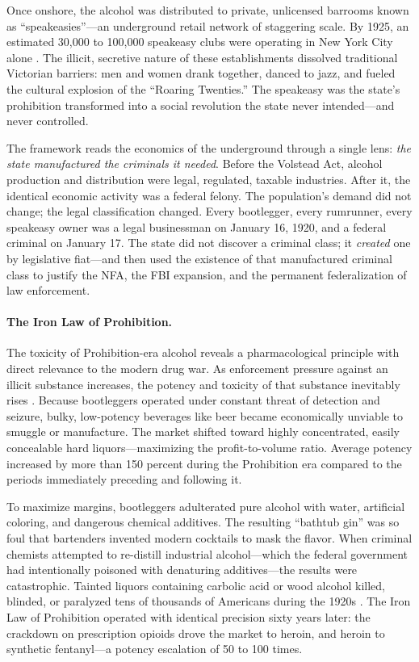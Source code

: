 \documentclass[12pt,openany]{book}
\begin{document}
Once onshore, the alcohol was distributed to private, unlicensed barrooms known as ``speakeasies''---an underground retail network of staggering scale. By 1925, an estimated 30,000 to 100,000 speakeasy clubs were operating in New York City alone \cite{mobmuseum_speakeasies}. The illicit, secretive nature of these establishments dissolved traditional Victorian barriers: men and women drank together, danced to jazz, and fueled the cultural explosion of the ``Roaring Twenties.'' The speakeasy was the state's prohibition transformed into a social revolution the state never intended---and never controlled.

The framework reads the economics of the underground through a single lens: \textit{the state manufactured the criminals it needed}. Before the Volstead Act, alcohol production and distribution were legal, regulated, taxable industries. After it, the identical economic activity was a federal felony. The population's demand did not change; the legal classification changed. Every bootlegger, every rumrunner, every speakeasy owner was a legal businessman on January 16, 1920, and a federal criminal on January 17. The state did not discover a criminal class; it \textit{created} one by legislative fiat---and then used the existence of that manufactured criminal class to justify the NFA, the FBI expansion, and the permanent federalization of law enforcement.

\paragraph{The Iron Law of Prohibition.}
The toxicity of Prohibition-era alcohol reveals a pharmacological principle with direct relevance to the modern drug war. As enforcement pressure against an illicit substance increases, the potency and toxicity of that substance inevitably rises \cite{cato_prohibition}. Because bootleggers operated under constant threat of detection and seizure, bulky, low-potency beverages like beer became economically unviable to smuggle or manufacture. The market shifted toward highly concentrated, easily concealable hard liquors---maximizing the profit-to-volume ratio. Average potency increased by more than 150 percent during the Prohibition era compared to the periods immediately preceding and following it.

To maximize margins, bootleggers adulterated pure alcohol with water, artificial coloring, and dangerous chemical additives. The resulting ``bathtub gin'' was so foul that bartenders invented modern cocktails to mask the flavor. When criminal chemists attempted to re-distill industrial alcohol---which the federal government had intentionally poisoned with denaturing additives---the results were catastrophic. Tainted liquors containing carbolic acid or wood alcohol killed, blinded, or paralyzed tens of thousands of Americans during the 1920s \cite{mobmuseum_bathtub}. The Iron Law of Prohibition operated with identical precision sixty years later: the crackdown on prescription opioids drove the market to heroin, and heroin to synthetic fentanyl---a potency escalation of 50 to 100 times.
\end{document}
